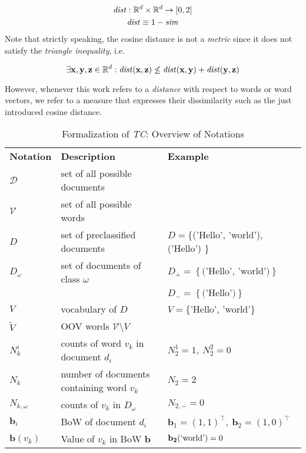 \begin{gather*}
	\mathit{dist}: \mathbb{R}^d \times \mathbb{R}^d \to [0, 2] \\
	\mathit{dist} \equiv 1 - \mathit{sim}
\end{gather*}
Note that strictly speaking, the cosine distance is not
a \emph{metric} since it does not satisfy the \emph{triangle
inequality}, i.e.

\begin{equation*}
	\exists \mathbf{x},\mathbf{y},\mathbf{z} \in \mathbb{R}^d: \mathit{dist}(\mathbf{x},\mathbf{z})
	\not\leq \mathit{dist}(\mathbf{x},\mathbf{y}) + \mathit{dist}(\mathbf{y},\mathbf{z})
\end{equation*}

However, whenever this work refers to a \emph{distance} with respect to
words or word vectors, we refer to a measure that expresses their dissimilarity
such as the just introduced cosine distance.

\begin{table}
\begin{tabular}{|l|l|l|}

\textbf{Notation} & \textbf{Description} & \textbf{Example} \\

$\mathcal{D}$ & set of all possible documents & \\
$\mathcal{V}$ & set of all possible words & \\
$D$ & set of preclassified documents & $D=$\{('Hello', 'world'),
('Hello') \} \\

$D_\omega$ & set of documents of class $\omega$ & $D_+ = \left\{
\text{('Hello', 'world')} \right\}$ \\
& & $D_- = \left\{ \text{('Hello')} \right\}$ \\ 

$V$ & vocabulary of $D$ & $V=$\{'Hello', 'world'\} \\
$\tilde{V}$ & OOV words $\mathcal{V} \setminus V$ &  \\
$N_k^i$ & counts of word $v_k$ in document $d_i$ & $N_2^1 = 1,\ N_2^2 = 0$ 
\\

$N_k$ & number of documents containing word $v_k$ & $N_2 = 2$ \\

$N_{k,\omega}$ & counts of $v_k$ in $D_\omega$ & $N_{2, -} = 0$ \\ 

$\mathbf{b}_i$ & BoW of document $d_i$ & $\mathbf{b}_1 = (1, 1)^\intercal,\
\mathbf{b}_2 = (1,0)^\intercal$ \\

$\mathbf{b}(v_k)$ & Value of $v_k$ in BoW $\mathbf{b}$ &
$\mathbf{b_2}(\text{\lq world\rq}) = 0$
 
\end{tabular}
\caption{Formalization of \emph{TC}: Overview of Notations}
\label{tab:notations}
\end{table}

